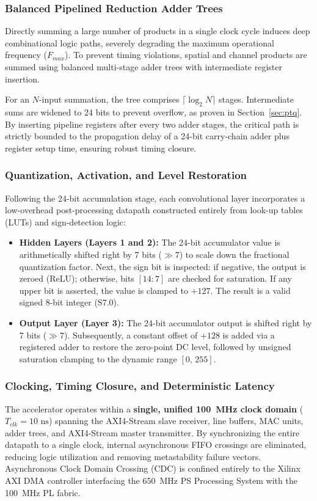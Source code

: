 \documentclass[conference]{IEEEtran}
\begin{document}
\subsubsection{Balanced Pipelined Reduction Adder Trees}
Directly summing a large number of products in a single clock cycle induces deep combinational logic paths, severely degrading the maximum operational frequency ($F_{max}$). To prevent timing violations, spatial and channel products are summed using balanced multi-stage adder trees with intermediate register insertion.

For an $N$-input summation, the tree comprises $\lceil \log_2 N \rceil$ stages. Intermediate sums are widened to 24 bits to prevent overflow, as proven in Section~\ref{sec:ptq}. By inserting pipeline registers after every two adder stages, the critical path is strictly bounded to the propagation delay of a 24-bit carry-chain adder plus register setup time, ensuring robust timing closure.

\subsubsection{Quantization, Activation, and Level Restoration}
Following the 24-bit accumulation stage, each convolutional layer incorporates a low-overhead post-processing datapath constructed entirely from look-up tables (LUTs) and sign-detection logic:
\begin{itemize}
    \item \textbf{Hidden Layers (Layers 1 and 2):} The 24-bit accumulator value is arithmetically shifted right by 7 bits ($\gg 7$) to scale down the fractional quantization factor. Next, the sign bit is inspected: if negative, the output is zeroed (ReLU); otherwise, bits $[14:7]$ are checked for saturation. If any upper bit is asserted, the value is clamped to $+127$. The result is a valid signed 8-bit integer ($\text{S7.0}$).
    \item \textbf{Output Layer (Layer 3):} The 24-bit accumulator output is shifted right by 7 bits ($\gg 7$). Subsequently, a constant offset of $+128$ is added via a registered adder to restore the zero-point DC level, followed by unsigned saturation clamping to the dynamic range $[0,\, 255]$.
\end{itemize}

\subsubsection{Clocking, Timing Closure, and Deterministic Latency}
The accelerator operates within a \textbf{single, unified 100~MHz clock domain} ($T_{clk} = 10\text{ ns}$) spanning the AXI4-Stream slave receiver, line buffers, MAC units, adder trees, and AXI4-Stream master transmitter. By synchronizing the entire datapath to a single clock, internal asynchronous FIFO crossings are eliminated, reducing logic utilization and removing metastability failure vectors. Asynchronous Clock Domain Crossing (CDC) is confined entirely to the Xilinx AXI DMA controller interfacing the 650~MHz PS Processing System with the 100~MHz PL fabric.
\end{document}
